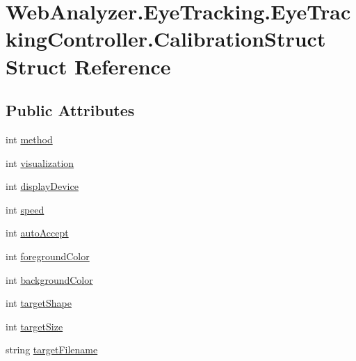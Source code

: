 \hypertarget{struct_web_analyzer_1_1_eye_tracking_1_1_eye_tracking_controller_1_1_calibration_struct}{}\section{Web\+Analyzer.\+Eye\+Tracking.\+Eye\+Tracking\+Controller.\+Calibration\+Struct Struct Reference}
\label{struct_web_analyzer_1_1_eye_tracking_1_1_eye_tracking_controller_1_1_calibration_struct}
\subsection*{Public Attributes}
\begin{DoxyCompactItemize}
\item 
int \hyperlink{struct_web_analyzer_1_1_eye_tracking_1_1_eye_tracking_controller_1_1_calibration_struct_aae2458c43b126efbdf2ca3e3635e2cbc}{method}
\item 
int \hyperlink{struct_web_analyzer_1_1_eye_tracking_1_1_eye_tracking_controller_1_1_calibration_struct_a47dcb619137477583cbb60b468ea86e0}{visualization}
\item 
int \hyperlink{struct_web_analyzer_1_1_eye_tracking_1_1_eye_tracking_controller_1_1_calibration_struct_a5b93d30befae354736ee795254ffc79f}{display\+Device}
\item 
int \hyperlink{struct_web_analyzer_1_1_eye_tracking_1_1_eye_tracking_controller_1_1_calibration_struct_a961631b5e394802b3213d1c93f96e25e}{speed}
\item 
int \hyperlink{struct_web_analyzer_1_1_eye_tracking_1_1_eye_tracking_controller_1_1_calibration_struct_a2d8116a62f518200bce0b869d758514e}{auto\+Accept}
\item 
int \hyperlink{struct_web_analyzer_1_1_eye_tracking_1_1_eye_tracking_controller_1_1_calibration_struct_adb3c18126e8fca75a57b92c0b5673228}{foreground\+Color}
\item 
int \hyperlink{struct_web_analyzer_1_1_eye_tracking_1_1_eye_tracking_controller_1_1_calibration_struct_ad5a87ec1ba188ae3524d80046241c444}{background\+Color}
\item 
int \hyperlink{struct_web_analyzer_1_1_eye_tracking_1_1_eye_tracking_controller_1_1_calibration_struct_ad5fe6f4447c209acb3cbbda0c913bfc0}{target\+Shape}
\item 
int \hyperlink{struct_web_analyzer_1_1_eye_tracking_1_1_eye_tracking_controller_1_1_calibration_struct_ad6fba3d6ac1ee64048863c0c45b17ec5}{target\+Size}
\item 
string \hyperlink{struct_web_analyzer_1_1_eye_tracking_1_1_eye_tracking_controller_1_1_calibration_struct_a1e371589218490ac06da94fe2963ace5}{target\+Filename}
\end{DoxyCompactItemize}


